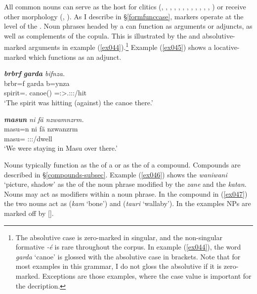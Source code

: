 All common nouns can serve as the host for  clitics (, , , , , , , , , , , , ) or receive other  morphology (, ). As I describe in {\S}\ref{formfunccase},  markers operate at the level of the . Noun phrases headed by a  can function as arguments or adjuncts, as well as complements of the copula. This is illustrated by the  and absolutive-marked arguments in example (\ref{ex044}).\footnote{The absolutive case is zero-marked in singular, and the non-singular formative \emph{-é} is rare throughout the corpus. In example (\ref{ex044}), the word \emph{garda} `canoe' is glossed with the absolutive case in brackets. Note that for most examples in this grammar, I do not gloss the absolutive if it is zero-marked. Exceptions are those examples, where the case value is important for the decription.} Example (\ref{ex045}) shows a locative-marked  which functions as an adjunct.

\begin{exe}
	\ex \emph{\textbf{brbrf} \textbf{garda} bifnza.}\\
	\gll brbr=f garda b=ynza\\
	spirit=\Erg.{\Sg} canoe(\Abs) \Med=\Stsg:\Sbj>\Tsg.\Masc:\Obj:\Pst:\Ipfv/hit\\
	\trans `The spirit was hitting (against) the canoe there.' 
	\label{ex044}
\end{exe}
\begin{exe}
	\ex \emph{\textbf{masun} ni fä nzwamnzrm.}\\
	\gll masu=n ni fä nzwanzrm\\
	masu={\Loc} {\Fnsg} {\Dist} \Fpl:\Sbj:\Pst:\Dur/dwell\\
	\trans `We were staying in Masu over there.' 
	\label{ex045}
\end{exe}

Nouns typically function as the  of a  or as the  of a  compound. Compounds are described in {\S}\ref{compounds-subsec}. Example (\ref{ex046}) shows the  \emph{waniwani} `picture, shadow' as the  of the noun phrase modified by the  \emph{zane} and the  \emph{katan}. Nouns may act as modifiers within a noun phrase. In the  compound in (\ref{ex047}) the two nouns act as  (\emph{kam} `bone') and  (\emph{tauri} `wallaby'). In the examples NPs are marked off by [].

